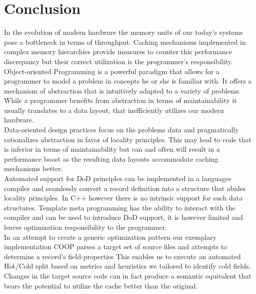 

\section{Conclusion}\label{conclusion}
In the evolution of modern hardware the memory units of our today's systems pose a bottleneck in terms of throughput. Caching mechanisms implemented in complex memory hierarchies provide measures to counter this performance discrepancy but their correct utilization is the programmer's responsibility.\\
Object-oriented Programming is a powerful paradigm that allows for a programmer to model a problem in concepts he or she is familiar with. It offers a mechanism of abstraction that is intuitively adapted to a variety of problems. While a programmer benefits from abstraction in terms of maintainability it usually translates to a data layout, that inefficiently utilizes our modern hardware.\\
Data-oriented design practices focus on the problems data and pragmatically rationalizes abstraction in favor of locality principles. This may lead to code that is inferior in terms of maintainability but can and often will result in a performance boost as the resulting data layouts accommodate caching mechanisms better.\\
Automated support for DoD principles can be implemented in a languages compiler and seamlessly convert a record definition into a structure that abides locality principles. In C++ however there is no intrinsic support for such data structures. Template meta programming has the ability to interact with the compiler and can be used to introduce DoD support, it is however limited and leaves optimization responsibility to the programmer.\\
In an attempt to create a generic optimization pattern our exemplary implementation COOP parses a target set of source files and attempts to determine a record's field-properties This enables us to execute an automated Hot/Cold split based on metrics and heuristics we tailored to identify cold fields. Changes in the target source code can in fact produce a semantic equivalent that bears the potential to utilize the cache better than the original.\\\\

